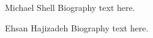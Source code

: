 \documentclass[12pt,journal,compsoc]{IEEEtran}
\begin{document}
\ifCLASSOPTIONcaptionsoff
  \newpage
\fi







%
%
%

% 

\begin{IEEEbiography}{Michael Shell}
Biography text here.
\end{IEEEbiography}

\begin{IEEEbiography}{Ehsan Hajizadeh}
	Biography text here.
\end{IEEEbiography}
\end{document}
